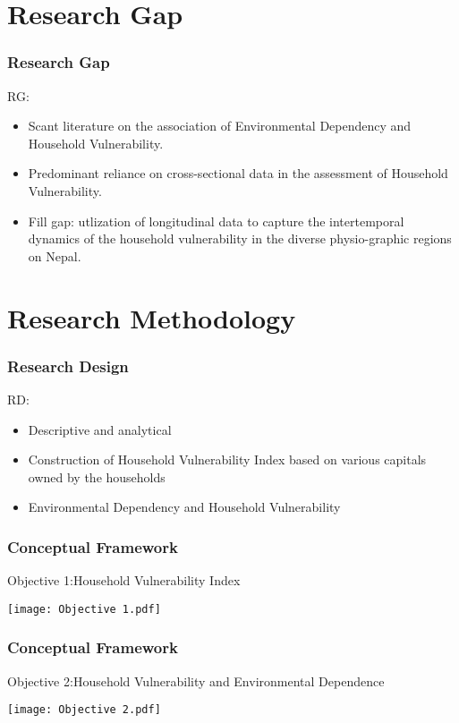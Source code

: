 \documentclass{beamer}
\begin{document}
	\section{Research Gap}
	\begin{frame}
		\frametitle{Research Gap}
		\vfill
		\begin{block}{RG:}
			\begin{itemize}
				\item \begin{justify} Scant literature on the  
					association of Environmental Dependency and Household Vulnerability. \end{justify} 
				
				\item \begin{justify} Predominant reliance on cross-sectional data in the assessment of Household Vulnerability. \end{justify} 
				
				\item \begin{justify} Fill gap: utlization of longitudinal data to capture the intertemporal dynamics of the household vulnerability in the diverse physio-graphic regions on Nepal.\end{justify} 
				
			\end{itemize}
		\end{block}
		\vfill
	\end{frame}
	
	\section{Research Methodology}
	\begin{frame}
		\frametitle{Research Design}
		\begin{exampleblock}{RD:}
			\begin{itemize}
				\item Descriptive and analytical
				\item Construction of Household Vulnerability Index based on various capitals owned by the households
				\item Environmental Dependency and Household Vulnerability
			\end{itemize}
		\end{exampleblock}
	\end{frame}
	
	\begin{frame}
		\frametitle{Conceptual Framework}
		\begin{exampleblock}{\centering Objective 1:Household Vulnerability Index}
		\end{exampleblock}
		\texttt{[image: Objective 1.pdf]}
	\end{frame}
	\begin{frame}
		\frametitle{Conceptual Framework}
		\begin{exampleblock}{\centering Objective 2:Household Vulnerability and Environmental Dependence}
		\end{exampleblock}
		\texttt{[image: Objective 2.pdf]}
	\end{frame}
	
\end{document}
